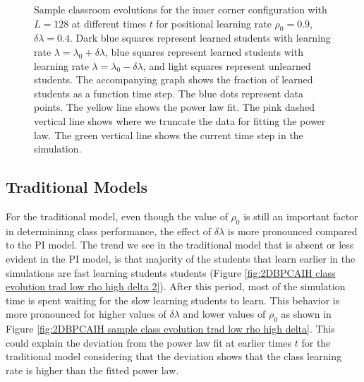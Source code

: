 \begin{figure}[htbp!]
   \caption{Sample classroom evolutions for the inner corner configuration with $L=128$ at different times $t$ for positional learning rate $\rho_0=0.9$, $\delta\lambda = 0.4$.
   Dark blue squares represent learned students with learning rate $\lambda = \lambda_0 + \delta\lambda$, blue squares represent learned students with learning rate $\lambda = \lambda_0 - \delta\lambda$, and light squares represent unlearned students.
   The accompanying graph shows the fraction of learned students as a function time step.
   The blue dots represent data points. 
   The yellow line shows the power law fit.
   The pink dashed vertical line shows where we truncate the data for fitting the power law.
   The green vertical line shows the current time step in the simulation.
   }
   \label{fig:2DBPCAIH sample class evolution high rho high delta}
\end{figure}

\subsection{Traditional Models}
For the traditional model, even though the value of $\rho_0$ is still an important factor in determininng class performance, the effect of $\delta\lambda$ is more pronounced compared to the PI model.
The trend we see in the traditional model that is absent or less evident in the PI model, is that majority of the students that learn earlier in the simulations are fast learning students students (Figure \ref{fig:2DBPCAIH class evolution trad low rho high delta 2}). 
After this period, most of the simulation time is spent waiting for the slow learning students to learn.
This behavior is more pronounced for higher values of $\delta\lambda$ and lower values of $\rho_0$ as shown in Figure \ref{fig:2DBPCAIH sample class evolution trad low rho high delta}.
This could explain the deviation from the power law fit at earlier times $t$ for the traditional model considering that the deviation shows that the class learning rate is higher than the fitted power law.

